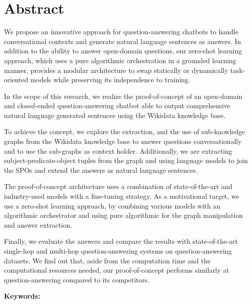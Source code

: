 \chapter*{Abstract}

We propose an innovative approach for question-answering chatbots to handle conversational contexts and generate natural language sentences as answers. In addition to the ability to answer open-domain questions, our zero-shot learning approach, which uses a pure algorithmic orchestration in a grounded learning manner, provides a modular architecture to swap statically or dynamically task-oriented models while preserving its independence to training.

In the scope of this research, we realize the proof-of-concept of an open-domain and closed-ended question-answering chatbot able to output comprehensive natural language generated sentences using the Wikidata knowledge base. 

To achieve the concept, we explore the extraction, and the use of sub-knowledge graphs from the Wikidata knowledge base to answer questions conversationally and to use the sub-graphs as context holder. Additionally, we are extracting subject-predicate-object tuples from the graph and using language models to join the SPOs and extend the answers as natural language sentences.

The proof-of-concept architecture uses a combination of state-of-the-art and industry-used models with a fine-tuning strategy. As a motivational target, we use a zero-shot learning approach, by combining various models with an algorithmic orchestrator and using pure algorithmic for the graph manipulation and answer extraction.

Finally, we evaluate the answers and compare the results with state-of-the-art single-hop and multi-hop question-answering systems on question-answering datasets. We find out that, aside from the computation time and the computational resources needed, our proof-of-concept performs similarly at question-answering compared to its competitors. 

\vskip0.5cm
\textbf{Keywords:} 
\Keywords